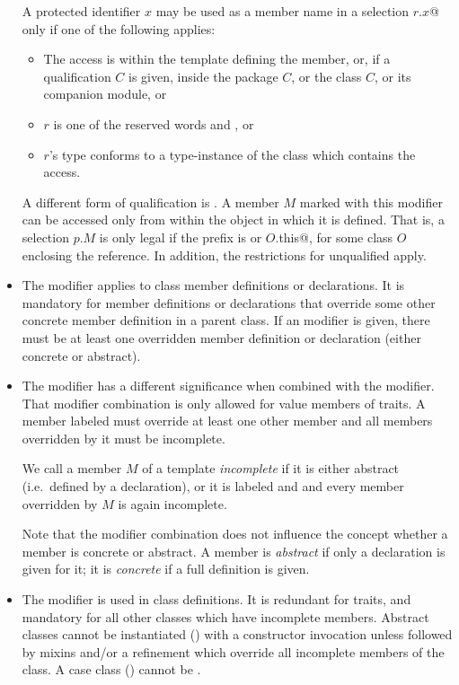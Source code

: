 \begin{itemize}
A protected identifier $x$ may be used as a member name in a selection
\lstinline@$r$.$x$@ only if one of the following applies:
\begin{itemize}
\item The access is within the template defining the member, or, if
  a qualification $C$ is given, inside the package $C$,
  or the class $C$, or its companion module, or
\item $r$ is one of the reserved words  and
  , or
\item $r$'s type conforms to a type-instance of the
  class which contains the access.
\end{itemize}

A different form of qualification is . A member
$M$ marked with this modifier can be accessed only from within
the object in which it is defined. That is, a selection $p.M$ is only
legal if the prefix is  or \lstinline@$O$.this@, for some
class $O$ enclosing the reference. In addition, the restrictions for
unqualified  apply.

\item
The  modifier applies to class member definitions or declarations.  It
is mandatory for member definitions or declarations that override some other concrete
member definition in a parent class. If an 
modifier is given, there must be at least one overridden member
definition or declaration (either concrete or abstract).  
\item
The  modifier has a different significance when
combined with the  modifier.  That modifier combination
is only allowed for value members of traits.  A member labeled
 must override at least one other member and 
all members overridden by it must be incomplete. 

We call a member $M$ of a template {\em incomplete} if it is either
abstract (i.e.\ defined by a declaration), or it is labeled
 and  and 
every member overridden by $M$ is again incomplete. 

Note that the  modifier combination does not
influence the concept whether a member is concrete or abstract. A
member is {\em abstract} if only a declaration is given for it; it is
{\em concrete} if a full definition is given.
\item
The  modifier is used in class definitions. It is
redundant for traits, and mandatory for all other classes which have
incomplete members.  Abstract classes cannot be instantiated
() with a constructor invocation unless
followed by mixins and/or a refinement which override all
incomplete members of the class. A case class () 
cannot be .


\end{itemize}
